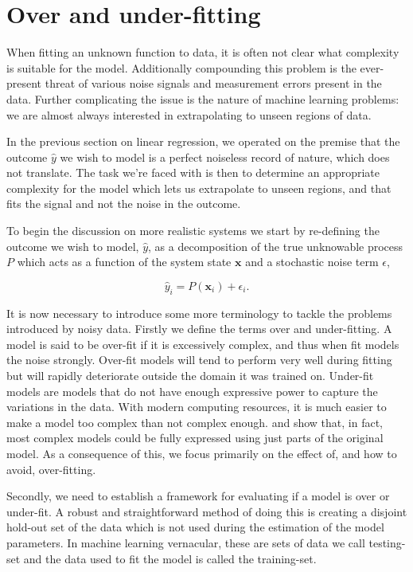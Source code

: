 \section{Over and under-fitting}\label{sec:fitting}

When fitting an unknown function to data, it is often not clear what complexity is suitable for the model. Additionally compounding this problem is the ever-present threat of various noise signals and measurement errors present in the data. Further complicating the issue is the nature of machine learning problems: we are almost always interested in extrapolating to unseen regions of data. 

In the previous section on linear regression, we operated on the premise that the outcome $\hat{y}$ we wish to model is a perfect noiseless record of nature, which does not translate. The task we're faced with is then to determine an appropriate complexity for the model which lets us extrapolate to unseen regions, and that fits the signal and not the noise in the outcome. 

To begin the discussion on more realistic systems we start by re-defining the outcome we wish to model, $\hat{y}$, as a decomposition of the true unknowable process $P$ which acts as a function of the system state $\mathbf{x}$ and a stochastic noise term $\epsilon$, 

\begin{equation}\label{eq:target}
\hat{y}_i = P(\mathbf{x}_i) + \epsilon_i.
\end{equation}

\noindent It is now necessary to introduce some more terminology to tackle the problems introduced by noisy data. Firstly we define the terms over and under-fitting. A model is said to be over-fit if it is excessively complex, and thus when fit models the noise strongly. Over-fit models will tend to perform very well during fitting but will rapidly deteriorate outside the domain it was trained on. Under-fit models are models that do not have enough expressive power to capture the variations in the data. With modern computing resources, it is much easier to make a model too complex than not complex enough. \citet{Frankle2019} and \citet{Frankle2018} show that, in fact, most complex models could be fully expressed using just parts of the original model. As a consequence of this, we focus primarily on the effect of, and how to avoid, over-fitting.

Secondly, we need to establish a framework for evaluating if a model is over or under-fit. A robust and straightforward method of doing this is creating a disjoint hold-out set of the data which is not used during the estimation of the model parameters. In machine learning vernacular, these are sets of data we call testing-set and the data used to fit the model is called the training-set. 

